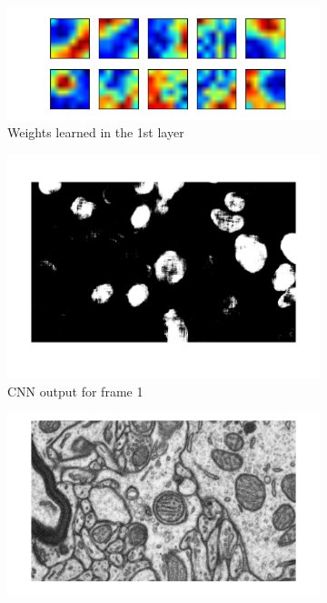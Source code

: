 \begin{figure}[h]
  \centering
  \begin{subfigure}[b]{0.40\textwidth}
   \includegraphics[width=\textwidth]{images/filters.png}
    \caption{Weights learned in the 1st layer}
  \end{subfigure}
  \begin{subfigure}[b]{0.40\textwidth}
    \includegraphics[width=\textwidth]{images/frame1.png}
    \caption{CNN output for frame 1}
  \end{subfigure}
    \begin{subfigure}[b]{0.40\textwidth}
   \includegraphics[width=\textwidth]{images/GT_truth.png}

\end{subfigure}
\end{figure}

